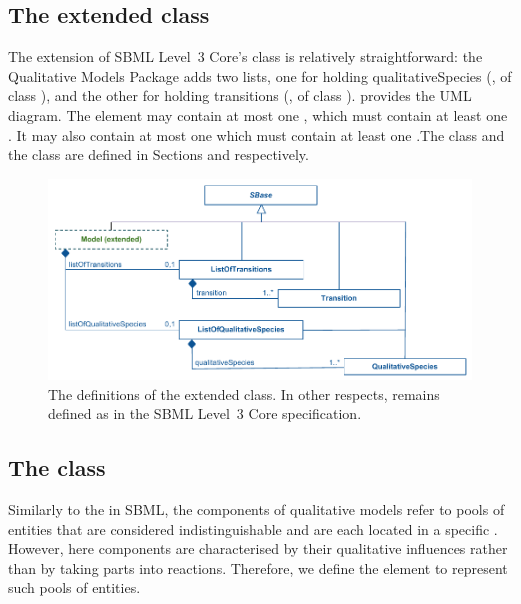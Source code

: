 \subsection{The extended  class}
\label{model-class}

The extension of SBML Level~3 Core's \Model class is relatively
straightforward: the Qualitative Models Package adds two lists,
one for holding qualitativeSpecies (, of class
\ListOfQualitativeSpecies), and the other for holding transitions (,
of class \ListOfTransitions).   provides the UML
diagram.  The  element may contain at most one \ListOfQualitativeSpecies, which must contain at least one \QualitativeSpecies. It may also contain at most one \ListOfTransitions which must contain at least one \Transition.The \QualitativeSpecies class and
the \Transition  class are defined in Sections  and  respectively.

\begin{figure}
  \includegraphics{figs/qual-extended-model-uml.pdf}
  \caption{The definitions of the extended \Model class. In other respects, \Model remains defined as
    in the SBML Level~3 Core specification.}
  \label{qual-extended-model-uml}
\end{figure}


\subsection{The  class}
\label{qualSpecies-class}
Similarly to the  in SBML, the components of qualitative models refer to pools of entities that are considered indistinguishable and are each located in a specific . However, here components are characterised by their qualitative influences rather than by taking parts into reactions. Therefore, we define the \QualitativeSpecies element to represent such pools of entities.

